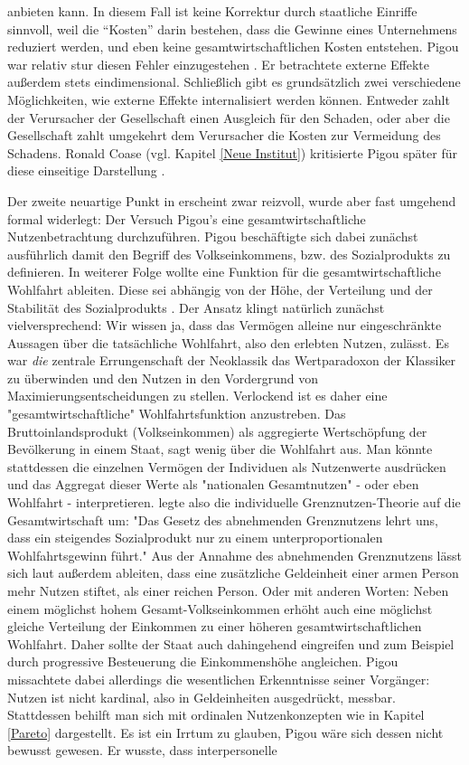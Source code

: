 anbieten kann. In diesem Fall ist keine Korrektur durch staatliche Einriffe sinnvoll, weil die "`Kosten"' darin bestehen, dass die Gewinne eines Unternehmens reduziert werden, und eben keine gesamtwirtschaftlichen Kosten entstehen. Pigou war relativ stur diesen Fehler einzugestehen \parencite[S. 153]{Johnson1960}. Er betrachtete externe Effekte außerdem stets eindimensional. Schließlich gibt es grundsätzlich zwei verschiedene Möglichkeiten, wie externe Effekte internalisiert werden können. Entweder zahlt der Verursacher der Gesellschaft einen Ausgleich für den Schaden, oder aber die Gesellschaft zahlt umgekehrt dem Verursacher die Kosten zur Vermeidung des Schadens. Ronald Coase (vgl. Kapitel \ref{Neue Institut}) kritisierte Pigou später für diese einseitige Darstellung \parencite[S. 243]{Cansier1989}.

Der zweite neuartige Punkt in \textcite{Pigou1920} erscheint zwar reizvoll, wurde aber fast umgehend formal widerlegt: Der Versuch Pigou's eine gesamtwirtschaftliche Nutzenbetrachtung durchzuführen. Pigou beschäftigte sich dabei zunächst ausführlich damit den Begriff des Volkseinkommens, bzw. des Sozialprodukts zu definieren. In weiterer Folge wollte eine Funktion für die gesamtwirtschaftliche Wohlfahrt ableiten. Diese sei abhängig von der Höhe, der Verteilung und der Stabilität des Sozialprodukts \parencite[S. 42]{Pigou1920}. Der Ansatz klingt natürlich zunächst vielversprechend: Wir wissen ja, dass das Vermögen alleine nur eingeschränkte Aussagen über die tatsächliche Wohlfahrt, also den erlebten Nutzen, zulässt. Es war \textit{die} zentrale Errungenschaft der Neoklassik das Wertparadoxon der Klassiker zu überwinden und den Nutzen in den Vordergrund von Maximierungsentscheidungen zu stellen. Verlockend ist es daher eine "gesamtwirtschaftliche" Wohlfahrtsfunktion anzustreben. Das Bruttoinlandsprodukt (Volkseinkommen) als aggregierte Wertschöpfung der Bevölkerung in einem Staat, sagt wenig über die Wohlfahrt aus. Man könnte stattdessen die einzelnen Vermögen der Individuen als Nutzenwerte ausdrücken und das Aggregat dieser Werte als "nationalen Gesamtnutzen" - oder eben Wohlfahrt - interpretieren. \textcite[S. 48]{Pigou1920} legte also die individuelle Grenznutzen-Theorie auf die Gesamtwirtschaft um: "Das Gesetz des abnehmenden Grenznutzens lehrt uns, dass ein steigendes Sozialprodukt nur zu einem unterproportionalen Wohlfahrtsgewinn führt." Aus der Annahme des abnehmenden Grenznutzens lässt sich laut \textcite[S. 53]{Pigou1920} außerdem ableiten, dass eine zusätzliche Geldeinheit einer armen Person mehr Nutzen stiftet, als einer reichen Person. Oder mit anderen Worten: Neben einem möglichst hohem Gesamt-Volkseinkommen erhöht auch eine möglichst gleiche Verteilung der Einkommen zu einer höheren gesamtwirtschaftlichen Wohlfahrt. Daher sollte der Staat auch dahingehend eingreifen und zum Beispiel durch progressive Besteuerung die Einkommenshöhe angleichen. Pigou missachtete dabei allerdings die wesentlichen Erkenntnisse seiner Vorgänger: Nutzen ist nicht kardinal, also in Geldeinheiten ausgedrückt, messbar. Stattdessen behilft man sich mit ordinalen Nutzenkonzepten wie in Kapitel \ref{Pareto} dargestellt. Es ist ein Irrtum zu glauben, Pigou wäre sich dessen nicht bewusst gewesen. Er wusste, dass interpersonelle 